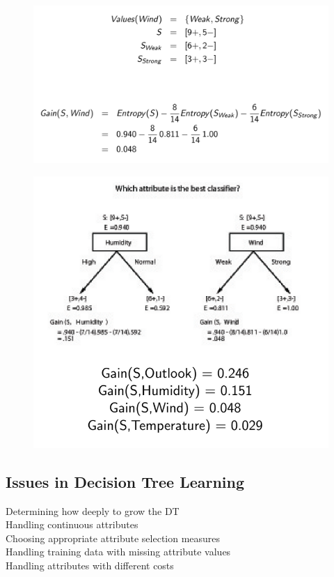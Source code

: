 \begin{figure}[H]
    \centering
    \includegraphics[width=12cm]{images/Decision Trees/Screenshot_20221004_144151.png}
    \caption{}
    \label{fig:image2.5}
\end{figure}

\begin{figure}[H]
    \centering
    \includegraphics[width=12cm]{images/Decision Trees/Screenshot_20221004_144402.png}
    \caption{}
    \label{fig:image2.6}
\end{figure}

\subsection{Issues in Decision Tree Learning}
Determining how deeply to grow the DT \\
Handling continuous attributes \\
Choosing appropriate attribute selection measures \\
Handling training data with missing attribute values \\
Handling attributes with different costs \\

